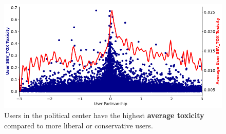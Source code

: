 







\begin{figure}
\begin{minipage}[l]{0.8\textwidth}
\includegraphics[width=1\columnwidth]{figures/user_toxicity_vs_partisanship.png} 
\end{minipage}

\begin{minipage}[l]{1\textwidth}
\caption{Users in the political center have the highest \textbf{average toxicity} compared to more liberal or conservative users. \label{fig:toxicity-vs-polarization}}
\end{minipage}

\end{figure}


